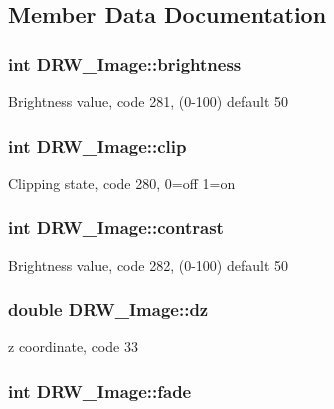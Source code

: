 \subsection{Member Data Documentation}
\hypertarget{classDRW__Image_a7d088d2d2bca24de4e44cfc40e5f30bf}{
\subsubsection[{brightness}]{\setlength{\rightskip}{0pt plus 5cm}int D\-R\-W\-\_\-\-Image\-::brightness}}\label{classDRW__Image_a7d088d2d2bca24de4e44cfc40e5f30bf}
Brightness value, code 281, (0-\/100) default 50 \hypertarget{classDRW__Image_a8d1f1854dc9b76525aa03fad3b007a58}{
\subsubsection[{clip}]{\setlength{\rightskip}{0pt plus 5cm}int D\-R\-W\-\_\-\-Image\-::clip}}\label{classDRW__Image_a8d1f1854dc9b76525aa03fad3b007a58}
Clipping state, code 280, 0=off 1=on \hypertarget{classDRW__Image_ad3ba08920ac1d83d073ba1f408cceb09}{
\subsubsection[{contrast}]{\setlength{\rightskip}{0pt plus 5cm}int D\-R\-W\-\_\-\-Image\-::contrast}}\label{classDRW__Image_ad3ba08920ac1d83d073ba1f408cceb09}
Brightness value, code 282, (0-\/100) default 50 \hypertarget{classDRW__Image_ada1bb1fd948f6318a4c8513e35b8224d}{
\subsubsection[{dz}]{\setlength{\rightskip}{0pt plus 5cm}double D\-R\-W\-\_\-\-Image\-::dz}}\label{classDRW__Image_ada1bb1fd948f6318a4c8513e35b8224d}
z coordinate, code 33 \hypertarget{classDRW__Image_a29d7bf7561ed378e6f4634557aae88db}{
\subsubsection[{fade}]{\setlength{\rightskip}{0pt plus 5cm}int D\-R\-W\-\_\-\-Image\-::fade}}\label{classDRW__Image_a29d7bf7561ed378e6f4634557aae88db}

